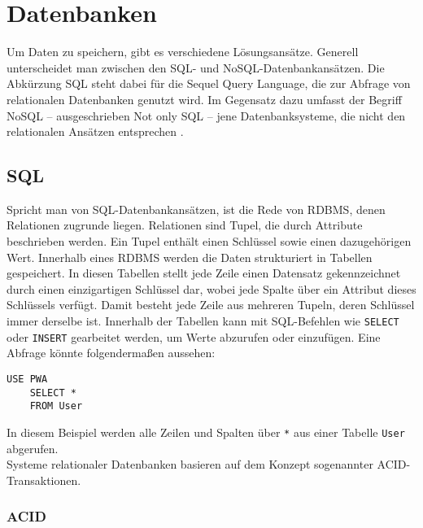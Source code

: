 \chapter{Datenbanken}\label{mongo}

Um Daten zu speichern, gibt es verschiedene Lösungsansätze. Generell unterscheidet man zwischen den SQL- und NoSQL-Datenbankansätzen. Die Abkürzung \glqq SQL\grqq{} steht dabei für die \glqq Sequel Query Language\grqq{}, die zur Abfrage von relationalen Datenbanken genutzt wird. Im Gegensatz dazu umfasst der Begriff \glqq NoSQL\grqq{} – ausgeschrieben \glqq Not only SQL\grqq{} – jene Datenbanksysteme, die nicht den relationalen Ansätzen entsprechen \cite{eins}.

\section{SQL}
Spricht man von SQL-Datenbankansätzen, ist die Rede von \ac{RDBMS}, denen Relationen zugrunde liegen. Relationen sind Tupel, die durch Attribute beschrieben werden. Ein Tupel enthält einen Schlüssel sowie einen dazugehörigen Wert.
Innerhalb eines RDBMS werden die Daten strukturiert in Tabellen gespeichert. In diesen Tabellen stellt jede Zeile einen Datensatz gekennzeichnet durch einen einzigartigen Schlüssel dar, wobei jede Spalte über ein Attribut dieses Schlüssels verfügt. Damit besteht jede Zeile aus mehreren Tupeln, deren Schlüssel immer derselbe ist. Innerhalb der Tabellen kann mit SQL-Befehlen wie \texttt{SELECT} oder \texttt{INSERT} gearbeitet werden, um Werte abzurufen oder einzufügen. Eine Abfrage könnte folgendermaßen aussehen:

\begin{lstlisting}[caption=SQL SELECT-Abfrage, label=lst:selectabfrage,float=!htb]
    USE PWA
    SELECT *
    FROM User
\end{lstlisting}    
    
In diesem Beispiel werden alle Zeilen und Spalten über \texttt{*} aus einer Tabelle \texttt{User} abgerufen.\\

Systeme relationaler Datenbanken basieren auf dem Konzept sogenannter ACID-Transaktionen.

\subsection{ACID}

